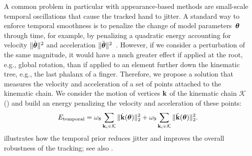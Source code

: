 A common problem in particular with appearance-based methods are small-scale temporal oscillations that cause the tracked hand to jitter. A standard way to enforce temporal smoothness is to penalize the change of model parameters~$\boldsymbol{\theta}$ through time, for example, by penalizing a quadratic energy accounting for velocity $\|\dot {\boldsymbol{\theta}}\|^2$ and acceleration $\|\ddot {\boldsymbol{\theta}}\|^2$~\cite{wei_siga12}. 
% 
% 
However, if we consider a perturbation of the same magnitude, it would have a much greater effect if applied at the root, e.g., global rotation, than if applied to an element further down the kinematic tree, e.g., the last phalanx of a finger. 
Therefore, we propose a solution that measures the velocity and acceleration of a set of points attached to the kinematic chain. We consider the motion of vertices $\mathbf{k}$ of the kinematic chain $\mathcal{K}$ () and build an energy penalizing the velocity and acceleration of these points:
\begin{eqnarray}
    E_{\text{temporal}} = \omega_8 \sum_{\mathbf{k}_i \in \mathcal{K}} \| \dot {\mathbf{k}}(\boldsymbol{\theta}) \|_2^2 + \omega_9 \sum_{\mathbf{k}_i \in \mathcal{K}} \| \ddot {\mathbf{k}}(\boldsymbol{\theta}) \|_2^2.
\end{eqnarray}
%
 illustrates how the temporal prior reduces jitter and improves the overall robustness of the tracking; see also \VideoHtrackTemporal.
